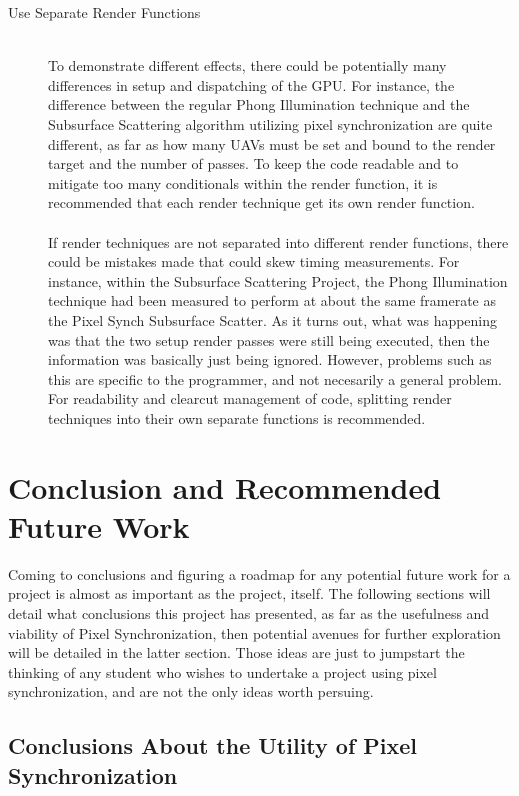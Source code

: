 \documentclass[a4paper, 12pt]{article}
\begin{document}
\begin{description}
\item[Use Separate Render Functions] \hfill \\

To demonstrate different effects, there could be potentially many differences
in setup and dispatching of the GPU. For instance, the difference between the
regular Phong Illumination technique and the Subsurface Scattering algorithm
utilizing pixel synchronization are quite different, as far as how many UAVs
must be set and bound to the render target and the number of passes. To keep
the code readable and to mitigate too many conditionals within the render
function, it is recommended that each render technique get its own render
function. \\ \\ If render techniques are not separated into different render
functions, there could be mistakes made that could skew timing measurements.
For instance, within the Subsurface Scattering Project, the Phong Illumination
technique had been measured to perform at about the same framerate as the
Pixel Synch Subsurface Scatter. As it turns out, what was happening was that
the two setup render passes were still being executed, then the information
was basically just being ignored. However, problems such as this are specific
to the programmer, and not necesarily a general problem. For readability and
clearcut management of code, splitting render techniques into their own
separate functions is recommended.

\end{description}

\pagebreak

\section{Conclusion and Recommended Future Work}

Coming to conclusions and figuring a roadmap for any potential future work for
a project is almost as important as the project, itself. The following
sections will detail what conclusions this project has presented, as far as
the usefulness and viability of Pixel Synchronization, then potential avenues
for further exploration will be detailed in the latter section. Those ideas
are just to jumpstart the thinking of any student who wishes to undertake a
project using pixel synchronization, and are not the only ideas worth
persuing.

\subsection{Conclusions About the Utility of Pixel Synchronization}
\end{document}
